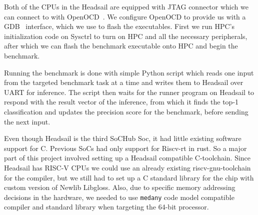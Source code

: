 \documentclass[12pt,a4paper,english
]{tunithesis}
\begin{document}
Both of the CPUs in the Headsail are equipped with JTAG connector which we can connect to with OpenOCD~\cite{openocd2023}. We configure OpenOCD to provide us with a GDB~\cite{gdb2023} interface, which we use to flash the executables. First we run HPC's initialization code on Sysctrl to turn on HPC and all the necessary peripherals, after which we can flash the benchmark executable onto HPC and begin the benchmark.

Running the benchmark is done with simple Python script which reads one input from the targeted benchmark task at a time and writes them to Headsail over UART for inference.
The script then waits for the runner program on Headsail to respond with the result vector of the inference, from which it finds the top-1 classification and updates the precision score for the benchmark, before sending the next input.

Even though Headsail is the third SoCHub Soc, it had little existing software support for C. Previous SoCs had only support for Riscv-rt in rust. So a major part of this project involved setting up a Headsail compatible C-toolchain. Since Headsail has RISC-V CPUs we could use an already existing riscv-gnu-toolchain for the compiler, but we still had to set up a C standard library for the chip with custom version of Newlib Libgloss. Also, due to specific memory addressing decisions in the hardware, we needed to use \texttt{medany} code model compatible compiler and standard library when targeting the 64-bit processor.
\end{document}

